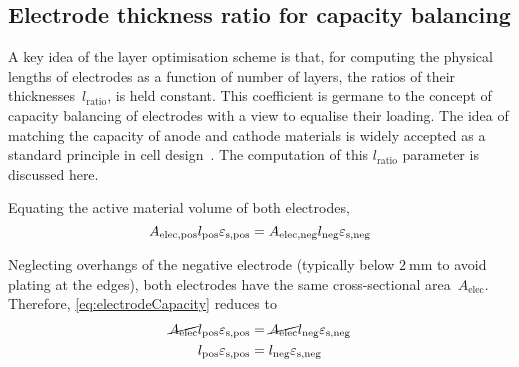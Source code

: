 
\subsection{Electrode thickness ratio for capacity balancing}\label{sec:electroderatio}

A key idea of the layer optimisation  scheme is that, for computing the physical
lengths of  electrodes as a  function of number of  layers, the ratios  of their
thicknesses~$l_\text{ratio}$, is  held constant. This coefficient  is germane to
the concept  of capacity balancing of  electrodes with a view  to equalise their
loading. The  idea of matching  the capacity of  anode and cathode  materials is
widely accepted  as a standard principle  in cell design~\cite{Ramadesigan2012}.
The computation of this $l_\text{ratio}$ parameter is discussed here.

Equating  the active material volume of both electrodes,
\begin{equation}
    A_\text{elec,pos}l_\text{pos}  \varepsilon_\text{s,pos} = A_\text{elec,neg}l_\text{neg}  \varepsilon_\text{s,neg} \label{eq:electrodeCapacity}\\
\end{equation}

Neglecting   overhangs    of   the    negative   electrode    (typically   below
$\SI{2}{\milli\meter}$    to    avoid    plating    at    the    edges),    both
electrodes  have  the   same  cross-sectional  area~$A_\text{elec}$.  Therefore,
\cref{eq:electrodeCapacity} reduces to
\begin{align}
    \cancel{A_\text{elec}}l_\text{pos}  \varepsilon_\text{s,pos} & = \cancel{A_\text{elec}}l_\text{neg}  \varepsilon_\text{s,neg}  \\
    l_\text{pos}  \varepsilon_\text{s,pos}                       & = l_\text{neg}  \varepsilon_\text{s,neg}\label{eq:electrodeCapequalarea}
\end{align}


